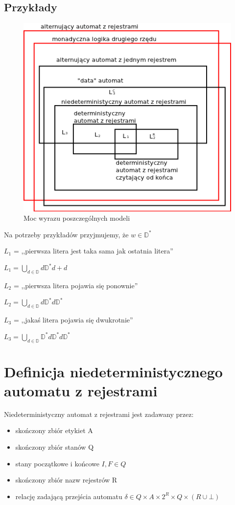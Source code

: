 \documentclass[a4paper,12pt]{report}
\newcommand{\data}{\mathbb D}
\begin{document}
\subsection{Przykłady}
\begin{figure}
\begin{center}
\includegraphics{images/podzial_automatow.png}
\end{center}
\caption{Moc wyrazu poszczególnych modeli}
\end{figure}
Na potrzeby przykładów przyjmujemy, że $ w \in \data^* $

$L_1$ = ,,pierwsza litera jest taka sama jak ostatnia litera''

$L_1 = {\bigcup \limits _{d \in \data} d\data^*d + d}$

$L_2$ = ,,pierwsza litera pojawia się ponownie''

$L_2 = {\bigcup \limits _{d \in \data} d\data^*d\data^*}$

$L_3$ = ,,jakaś litera pojawia się dwukrotnie''

$L_3 = {\bigcup \limits _{d \in \data} \data^*d\data^*d\data^*}$

\section {Definicja niedeterministycznego automatu z rejestrami}
Niedeterministyczny automat z rejestrami jest zadawany przez:
\begin{itemize}
\item skończony zbiór etykiet A
\item skończony zbiór stanów Q
\item stany początkowe i końcowe $I,F \in Q$
\item skończony zbiór nazw rejestrów R
\item relację zadającą przejścia automatu $\delta 
\in Q \times A \times 2^R \times Q \times (R \cup \bot)$
\end{itemize}
\end{document}
